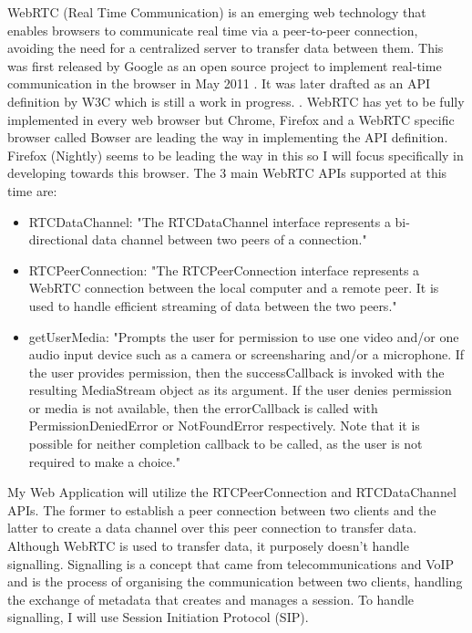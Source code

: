 \documentclass[]{report}
\begin{document}
			WebRTC (Real Time Communication) is an emerging web technology that enables browsers to communicate real time via a peer-to-peer connection, avoiding the need for a centralized server to transfer data between them. This was first released by Google as an open source project to implement real-time communication in the browser in May 2011 \cite{Google WebRTC Release}. It was later drafted as an API definition by W3C which is still a work in progress. \cite{W3C WebRTC Definition}. WebRTC has yet to be fully implemented in every web browser but Chrome, Firefox and a WebRTC specific browser called Bowser are leading the way in implementing the API definition. Firefox (Nightly) seems to be leading the way in this so I will focus specifically in developing towards this browser\cite{WebRTC browser support}.
			The 3 main WebRTC APIs supported at this time are:
				\begin{itemize}
					\item RTCDataChannel:
					"The RTCDataChannel interface represents a bi-directional data channel between two peers of a connection." \cite{Mozilla Web API}
					\item RTCPeerConnection:
					"The RTCPeerConnection interface represents a WebRTC connection between the local computer and a remote peer. It is used to handle efficient streaming of data between the two peers." 
					\cite{Mozilla Web API}
					\item getUserMedia:
					"Prompts the user for permission to use one video and/or one audio input device such as a camera or screensharing and/or a microphone. If the user provides permission, then the successCallback is invoked with the resulting MediaStream object as its argument. If the user denies permission or media is not available, then the errorCallback is called with PermissionDeniedError or NotFoundError respectively. Note that it is possible for neither completion callback to be called, as the user is not required to make a choice."
					\cite{Mozilla Web API}
				\end{itemize}
			My Web Application will utilize the RTCPeerConnection and RTCDataChannel APIs. The former to establish a peer connection between two clients and the latter to create a data channel over this peer connection to transfer data.	Although WebRTC is used to transfer data, it purposely doesn't handle signalling. Signalling is a concept that came from telecommunications and VoIP and is the process of organising the communication between two clients, handling the exchange of metadata that creates and manages a session. To handle signalling, I will use Session Initiation Protocol (SIP).
			
\end{document}
